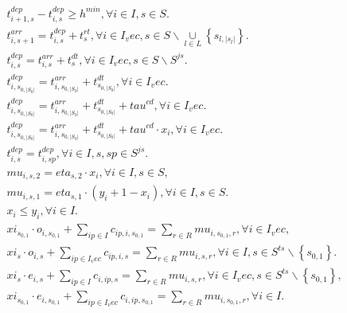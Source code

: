 \begin{align}
  & t_{i + 1 , s}^{d e p} - t_{i , s}^{d e p} \geq h^{m i n} , \forall i \in I , s \in S . \tag{eq\_0001} \\
  & t_{i , s + 1}^{a r r} = t_{i , s}^{d e p} + t_{s}^{r t} , \forall i \in I_vec , s \in S \backslash \underset{l \in L}{\cup} \left\{s_{l , \left|s_{l}\right|}\right\} . \tag{eq\_0002} \\
  & t_{i , s}^{d e p} = t_{i , s}^{a r r} + t_{s}^{d t} , \forall i \in I_vec , s \in S \backslash S^{j s} . \tag{eq\_0003} \\
  & t_{i , s_{0 , \left|S_{0}\right|}}^{d e p} = t_{i , s_{0 , \left|S_{0}\right|}}^{a r r} + t_{s_{0 , \left|S_{0}\right|}}^{d t} , \forall i \in I_vec . \tag{eq\_0004} \\
  & t_{i , s_{0 , \left|S_{0}\right|}}^{d e p} = t_{i , s_{0 , \left|S_{0}\right|}}^{a r r} + t_{s_{0 , \left|S_{0}\right|}}^{d t} + \mathit{tau}^{c d} , \forall i \in I_vec . \tag{eq\_0005} \\
  & t_{i , s_{0 , \left|S_{0}\right|}}^{d e p} = t_{i , s_{0 , \left|S_{0}\right|}}^{a r r} + t_{s_{0 , \left|S_{0}\right|}}^{d t} + \mathit{tau}^{c d} \cdot x_{i} , \forall i \in I_vec . \tag{eq\_0006} \\
  & t_{i , s}^{d e p} = t_{i , sp}^{d e p} , \forall i \in I , s , sp \in S^{j s} . \tag{eq\_0007} \\
  & \mathit{mu}_{i , s , 2} = \mathit{eta}_{s , 2} \cdot x_{i} , \forall i \in I , s \in S , \tag{eq\_0008} \\
  & \mathit{mu}_{i , s , 1} = \mathit{eta}_{s , 1} \cdot \left(y_{i} + 1 - x_{i}\right) , \forall i \in I , s \in S . \tag{eq\_0009} \\
  & x_{i} \leq y_{i} , \forall i \in I . \tag{eq\_0010} \\
  & \mathit{xi}_{s_{0 , 1}} \cdot o_{i , s_{0 , 1}} + \sum_{ip \in {I}} c_{ip , i , s_{0 , 1}} = \sum_{r \in R} \mathit{mu}_{i , s_{0 , 1} , r} , \forall i \in I_vec , \tag{eq\_0011} \\
  & \mathit{xi}_{s} \cdot o_{i , s} + \sum_{ip \in I_vec} c_{ip , i , s} = \sum_{r \in R} \mathit{mu}_{i , s , r} , \forall i \in {I} , s \in S^{t s} \backslash \left\{s_{0 , 1}\right\} . \tag{eq\_0012} \\
  & \mathit{xi}_{s} \cdot e_{i , s} + \sum_{ip \in {I}} c_{i , ip , s} = \sum_{r \in R} \mathit{mu}_{i , s , r} , \forall i \in I_vec , s \in S^{t s} \backslash \left\{s_{0 , 1}\right\} , \tag{eq\_0013} \\
  & \mathit{xi}_{s_{0 , 1}} \cdot e_{i , s_{0 , 1}} + \sum_{ip \in I_vec} c_{i , ip , s_{0 , 1}} = \sum_{r \in R} \mathit{mu}_{i , s_{0 , 1} , r} , \forall i \in {I} . \tag{eq\_0014} \\

\end{align}
